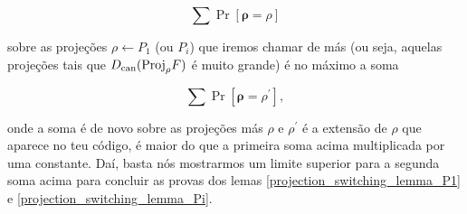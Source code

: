 \begin{equation*}
	\sum \Pr[\boldsymbol{\rho} = \rho]
\end{equation*}

sobre as projeções $\rho \leftarrow P_{1}$ (ou $P_{i}$) que iremos chamar de más (ou seja, aquelas projeções tais que $D_{\text{can}}(\text{Proj}_{\rho}F)$ é muito grande) é no máximo a soma

\begin{equation*}
	\sum \Pr[\boldsymbol{\rho} = \rho^{\prime}],
\end{equation*}

onde a soma é de novo sobre as projeções más $\rho$ e $\rho^{\prime}$ é a extensão de $\rho$ que aparece no teu código, é maior do que a primeira soma acima multiplicada por uma constante. Daí, basta nós mostrarmos um limite superior para a segunda soma acima para concluir as provas dos lemas \ref{projection_switching_lemma_P1} e \ref{projection_switching_lemma_Pi}.

